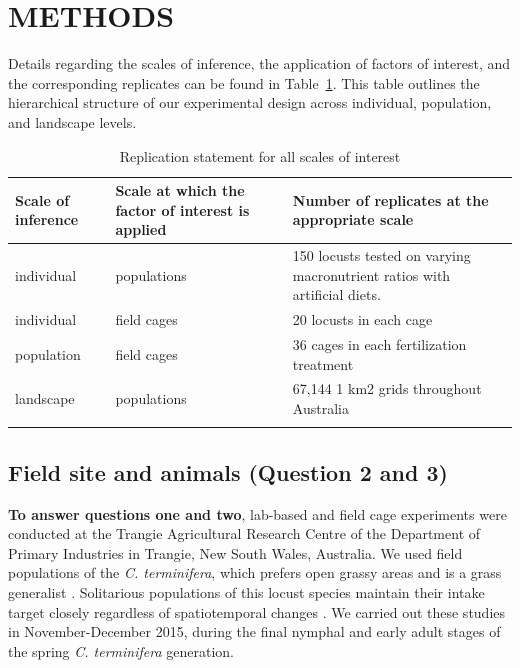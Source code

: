\documentclass[
]{article}
\begin{document}
\section{METHODS}\label{methods}

Details regarding the scales of inference, the application of factors of
interest, and the corresponding replicates can be found in
Table~\ref{tbl-replication-statement}. This table outlines the
hierarchical structure of our experimental design across individual,
population, and landscape levels.

\begingroup
\setlength{}
\setlength{}\fontsize{8.2pt}{9.9pt}\selectfont

\begin{longtable}{@{\extracolsep{\fill}}lll}

\toprule
Scale of inference & Scale at which the factor of interest is applied & Number of replicates at the appropriate scale \\ 
\midrule\addlinespace[2.5pt]
individual & populations & 150 locusts tested on varying macronutrient ratios with artificial diets. \\ 
individual & field cages & 20 locusts in each cage \\ 
population & field cages & 36 cages in each fertilization treatment \\ 
landscape & populations & 67,144 1 km2 grids throughout Australia \\ 
\bottomrule

\caption{\label{tbl-replication-statement}Replication statement for all
scales of interest}

\tabularnewline

\end{longtable}

\endgroup

\subsection{Field site and animals (Question 2 and
3)}\label{field-site-and-animals-question-2-and-3}

\textbf{To answer questions one and two}, lab-based and field cage
experiments were conducted at the Trangie Agricultural Research Centre
of the Department of Primary Industries in Trangie, New South Wales,
Australia. We used field populations of the \emph{C. terminifera}, which
prefers open grassy areas and is a grass generalist
\citep{key_general_1945}. Solitarious populations of this locust species
maintain their intake target closely regardless of spatiotemporal
changes \citep{lawton_mismatched_2021}. We carried out these studies in
November-December 2015, during the final nymphal and early adult stages
of the spring \emph{C. terminifera} generation.
\end{document}

